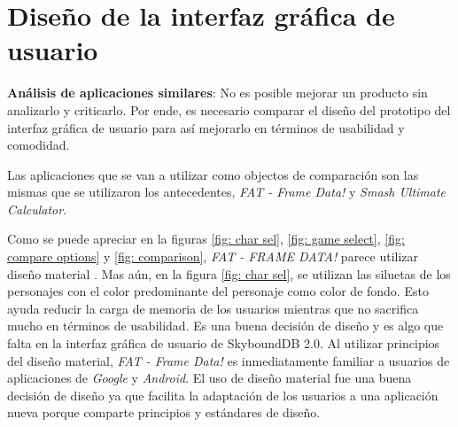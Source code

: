 \section{Diseño de la interfaz gráfica de usuario}
\textbf{Análisis de aplicaciones similares}: No es posible mejorar un producto sin analizarlo y criticarlo. Por ende, es necesario comparar el diseño del prototipo del interfaz gráfica de usuario para así mejorarlo en términos de usabilidad y comodidad.

Las aplicaciones que se van a utilizar como objectos de comparación son las mismas que se utilizaron los antecedentes, \textit{FAT - Frame Data!} y \textit{Smash Ultimate Calculator}.

Como se puede apreciar en la figuras \ref{fig: char sel}, \ref{fig: game select}, \ref{fig: compare options} y \ref{fig: comparison}, \textit{FAT - FRAME DATA!} parece utilizar diseño material \cite{noauthor_designing_nodate}. Mas aún, en la figura \ref{fig: char sel}, se utilizan las siluetas de los personajes con el color predominante del personaje como color de fondo. Esto ayuda reducir la carga de memoria de los usuarios mientras que no sacrifica mucho en términos de usabilidad. Es una buena decisión de diseño y es algo que falta en la interfaz gráfica de usuario de SkyboundDB 2.0. Al utilizar principios del diseño material, \textit{FAT - Frame Data!} es inmediatamente familiar a usuarios de aplicaciones de \textit{Google} y \textit{Android}. El uso de diseño material fue una buena decisión de diseño ya que facilita la adaptación de los usuarios a una aplicación nueva porque comparte principios y estándares de diseño.


